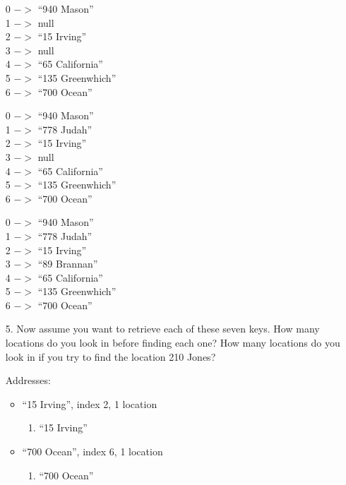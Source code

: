 \documentclass[10pt]{article}
\begin{document}
\begin{enumerate}
			\vspace{0.5cm}
			0 $->$ ``940 Mason''\\
			1 $->$ null\\
			2 $->$ ``15 Irving''\\
			3 $->$ null\\
			4 $->$ ``65 California''\\
			5 $->$ ``135 Greenwhich''\\
			6 $->$ ``700 Ocean''
			
			\vspace{0.5cm}
			0 $->$ ``940 Mason''\\
			1 $->$ ``778 Judah''\\
			2 $->$ ``15 Irving''\\
			3 $->$ null\\
			4 $->$ ``65 California''\\
			5 $->$ ``135 Greenwhich''\\
			6 $->$ ``700 Ocean''
			
			\vspace{0.5cm}
			0 $->$ ``940 Mason''\\
			1 $->$ ``778 Judah''\\
			2 $->$ ``15 Irving''\\
			3 $->$ ``89 Brannan''\\
			4 $->$ ``65 California''\\
			5 $->$ ``135 Greenwhich''\\
			6 $->$ ``700 Ocean''
		
		\item[5.] Now assume you want to retrieve each of these seven keys. How many locations do you look in before finding each one? How many locations do you look in if you try to find the location 210 Jones?
			
			\vspace{0.5cm}
			Addresses:
			\begin{itemize}
				\item ``15 Irving'', index 2, 1 location
					\begin{enumerate}
						\item ``15 Irving''
					\end{enumerate}
				
				\item ``700 Ocean'', index 6, 1 location
					\begin{enumerate}
						\item ``700 Ocean''
					\end{enumerate}
					

\end{itemize}
\end{enumerate}
\end{document}
